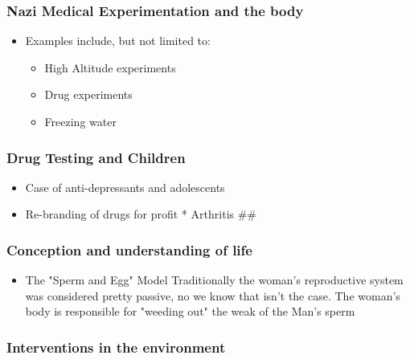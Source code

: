 \documentclass[11pt]{article}
\begin{document}
\subsubsection{Nazi Medical Experimentation and the body}
\label{sec-2-2-1}

\begin{itemize}
\item Examples include, but not limited to: 

\begin{itemize}
\item High Altitude experiments

\item Drug experiments

\item Freezing water
\end{itemize}
\end{itemize}

\subsubsection{Drug Testing and Children}
\label{sec-2-2-2}

\begin{itemize}
\item Case of anti-depressants and adolescents
\end{itemize}



\begin{itemize}
\item Re-branding of drugs for profit * Arthritis \#\#
\end{itemize}

\subsubsection{Conception and understanding of life}
\label{sec-2-2-3}

\begin{itemize}
\item The "Sperm and Egg" Model Traditionally the woman's reproductive system was considered pretty passive, no we know that isn't the case. The woman's body is responsible for "weeding out" the weak of the Man's sperm
\end{itemize}

\subsubsection{Interventions in the environment}
\label{sec-2-2-4}
\end{document}
